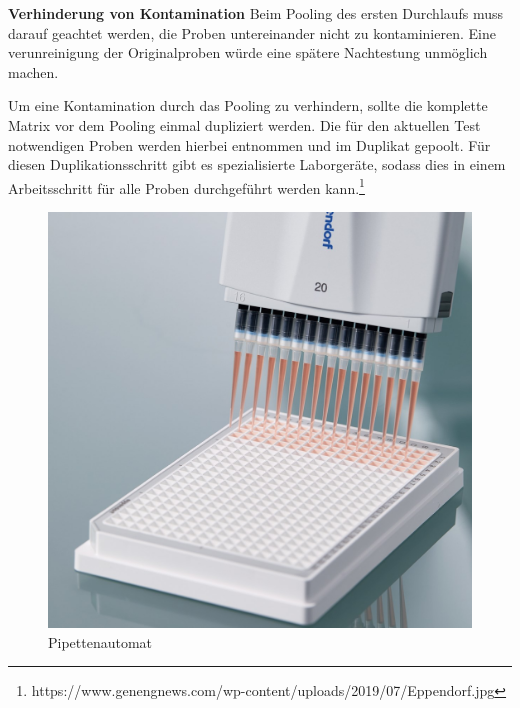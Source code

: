 \textbf{Verhinderung von Kontamination}\newline
Beim Pooling des ersten Durchlaufs muss darauf geachtet werden, die Proben untereinander nicht zu kontaminieren.
Eine verunreinigung der Originalproben würde eine spätere Nachtestung unmöglich machen.

Um eine Kontamination durch das Pooling zu verhindern, sollte die komplette Matrix vor dem Pooling einmal dupliziert werden. 
Die für den aktuellen Test notwendigen Proben werden hierbei entnommen und im Duplikat gepoolt.
Für diesen Duplikationsschritt gibt es spezialisierte Laborgeräte, sodass dies in einem Arbeitsschritt für alle Proben durchgeführt werden kann.\footnote{https://www.genengnews.com/wp-content/uploads/2019/07/Eppendorf.jpg}

\begin{figure}[h]
	\centering
	\includegraphics[width=.45\textwidth]{img/Pipettenmatrix}
	\caption{Pipettenautomat\footnotemark}
\end{figure}
